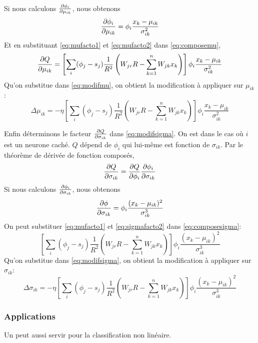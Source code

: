 Si nous calculons $\frac{\partial \phi_i}{\partial \mu_{ik}}$, nous obtenons
\begin{equation}\label{eq:mufacto2}
 \frac{\partial \phi_i}{\partial \mu_{ik}} = \phi_i \frac{x_k-\mu_{ik}}{\sigma_{ik}^2}
\end{equation}
Et en substituant \eqref{eq:mufacto1} et \eqref{eq:mufacto2} dans \eqref{eq:composemu},
\[\frac{\partial Q}{\partial \mu_{ik}} = \left[\sum_{i}(\phi_j - s_j) \frac{1}{R^2} \left(W_{jr}R - \sum_{k=1}^{n}W_{jk}x_k\right)\right] \phi_i\frac{x_k-\mu_{ik}}{\sigma_{ik}^2}\]
Qu'on substitue dans \eqref{eq:modifmu}, on obtient la modification à appliquer sur $\mu_{ik}$:
\[\Delta\mu_{ik} = -\eta \left[\sum_{i}(\phi_j - s_j) \frac{1}{R^2} \left(W_{jr}R - \sum_{k=1}^{n}W_{jk}x_k\right)\right] \phi_i\frac{x_k-\mu_{ik}}{\sigma_{ik}^2}\]

Enfin déterminons le facteur $\frac{\partial Q}{\partial \sigma_{ik}}$ dans \eqref{eq:modifsigma}. On est dans le cas où $i$ est un neurone caché.
$Q$ dépend de $\phi_i$ qui lui-même est fonction de $\sigma_{ik}$. Par le théorème de dérivée de fonction composés,
\begin{equation}\label{eq:composesigma}
 \frac{\partial Q}{\partial \sigma_{ik}} = \frac{\partial Q}{\partial \phi_i} \frac{\partial \phi_i}{\partial \sigma_{ik}}
\end{equation}
Si nous calculons $\frac{\partial \phi_i}{\partial \sigma_{ik}}$, nous obtenons
\begin{equation}\label{eq:sigmafacto2}
 \frac{\partial \phi}{\partial \sigma_{ik}} = \phi_i \frac{(x_k-\mu_{ik})^2}{\sigma_{ik}^3}
\end{equation}
On peut substituer \eqref{eq:mufacto1} et \eqref{eq:sigmafacto2} dans \eqref{eq:composesigma}:
\[\left[\sum_{i}(\phi_j - s_j) \frac{1}{R^2} \left(W_{jr}R - \sum_{k=1}^{n}W_{jk}x_k\right)\right] \phi_i \frac{(x_k-\mu_{ik})^2}{\sigma_{ik}^3}\]
Qu'on substitue dans \eqref{eq:modifsigma}, on obtient la modification à appliquer sur $\sigma_{ik}$:
\[\Delta \sigma_{ik} = -\eta \left[\sum_{i}(\phi_j - s_j) \frac{1}{R^2} \left(W_{jr}R - \sum_{k=1}^{n}W_{jk}x_k\right)\right] \phi_i \frac{(x_k-\mu_{ik})^2}{\sigma_{ik}^3}\]

\subsubsection{Applications}
Un \rbf peut aussi servir pour la classification non linéaire.\cite{statistica}